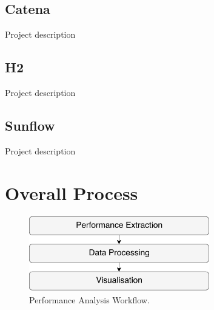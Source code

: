 \subsection{Catena}

 Project description

\subsection{H2}

Project description

\subsection{Sunflow}

Project description

\section{Overall Process}
\label{overall_process}

\begin{figure}
  \centering
  \includegraphics[width=0.7\textwidth]{images/workflow_overview_0}
  \caption{Performance Analysis Workflow.}
  \label{big_picture_perf_anal_workflow}
\end{figure}

